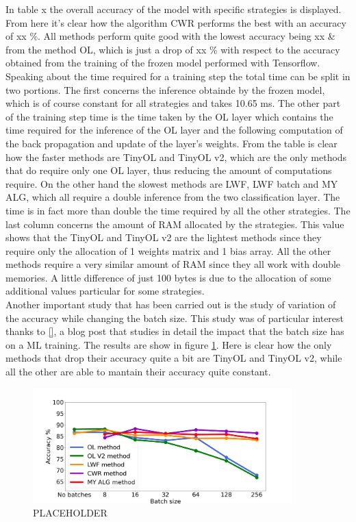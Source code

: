 \documentclass[12pt]{report}
\begin{document}
In table x the overall accuracy of the model with specific strategies is displayed. From here it's clear how the algorithm CWR performs the best with an accuracy of xx \%. All methods perform quite good with the lowest accuracy being xx \& from the method OL, which is just a drop of xx \% with respect to the accuracy obtained from the training of the frozen model performed with Tensorflow. Speaking about the time required for a training step the total time can be split in two portions. The first concerns the inference obtainde by the frozen model, which is of course constant for all strategies and takes 10.65 ms. The other part of the training step time is the time taken by the OL layer which contains the time required for the inference of the OL layer and the following computation of the back propagation and update of the layer's weights. From the table is clear how the faster methods are TinyOL and TinyOL v2, which are the only methods that do require only one OL layer, thus reducing the amount of computations require. On the other hand the slowest methods are LWF, LWF batch and MY ALG, which all require a double inference from the two classification layer. The time is in fact more than double the time required by all the other strategies. The last column concerns the amount of RAM allocated by the strategies. This value shows that the TinyOL and TinyOL v2 are the lightest methods since they require only the allocation of 1 weights matrix and 1 bias array. All the other methods require a very similar amount of RAM since they all work with double memories. A little difference of just 100 bytes is due to the allocation of some additional values particular for some strategies.  \\
Another important study that has been carried out is the study of variation of the accuracy while changing the batch size. This study was of particular interest thanks to \ref{}, a blog post that studies in detail the impact that the batch size has on a ML training. The results are show in figure \ref{fig:batch_size_letter}. Here is clear how the only methods that drop their accuracy quite a bit are TinyOL and TinyOL v2, while all the other are able to mantain their accuracy quite constant.
%
\begin{figure}[h!]
    \centering
    \includegraphics[width=100mm]{Figures/Chapter5/batch_size_letters.png} 
    \caption{PLACEHOLDER}
    \label{fig:batch_size_letter}    
\end{figure}
%
\end{document}
